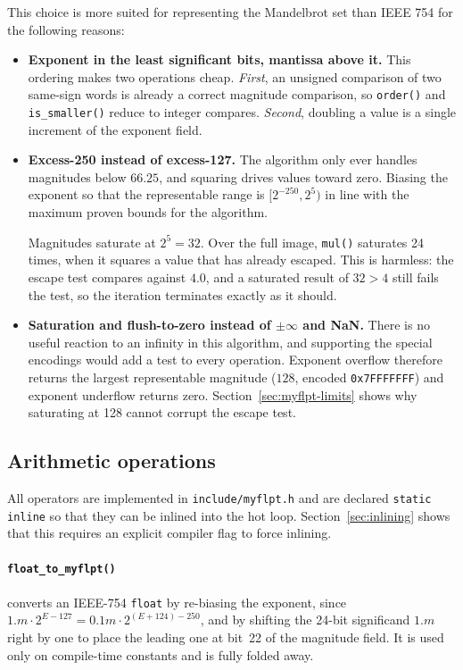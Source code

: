 \documentclass[10pt,a4paper]{article}
\begin{document}
This choice is more suited for representing the Mandelbrot set than IEEE 754 for the following reasons:
\begin{itemize}\itemsep1pt
  \item \textbf{Exponent in the least significant bits, mantissa above it.} This ordering makes
      two operations cheap. \textit{First}, an unsigned comparison of two same-sign words is already a
        correct magnitude comparison, so \texttt{order()} and \texttt{is\_smaller()} reduce to
        integer compares. \textit{Second}, doubling a value is a single increment of the exponent field.
  \item \textbf{Excess-250 instead of excess-127.} The algorithm only ever handles magnitudes
        below $66.25$, and squaring drives values toward zero. Biasing the exponent so that the
        representable range is $[2^{-250}, 2^{5})$ in line with the maximum proven bounds for the algorithm.

        Magnitudes saturate at $2^5 = 32$. Over the full image, \texttt{mul()} saturates
        24 times, when it squares a value that has already escaped. This is harmless: the escape
        test compares against $4.0$, and a saturated result of $32 > 4$ still fails the test, so
        the iteration terminates exactly as it should. 
  \item \textbf{Saturation and flush-to-zero instead of $\pm\infty$ and NaN.} There is no useful
        reaction to an infinity in this algorithm, and supporting the special encodings would add a
        test to every operation. Exponent overflow therefore returns the largest representable
        magnitude ($128$, encoded \texttt{0x7FFFFFFF}) and exponent underflow returns zero.
        Section~\ref{sec:myflpt-limits} shows why saturating at 128 cannot corrupt the escape test.
\end{itemize}

\subsection{Arithmetic operations}

All operators are implemented in \texttt{include/myflpt.h} and are declared \texttt{static inline} so that
they can be inlined into the hot loop. 
Section~\ref{sec:inlining} shows that this requires an explicit compiler flag to force inlining.

\paragraph{\texttt{float\_to\_myflpt()}} converts an IEEE-754 \texttt{float} by re-biasing the
exponent, since $1.m \cdot 2^{E-127} = 0.1m \cdot 2^{(E+124)-250}$, and by shifting the 24-bit
significand $1.m$ right by one to place the leading one at bit~22 of the magnitude field. It is
used only on compile-time constants and is fully folded away.
\end{document}

